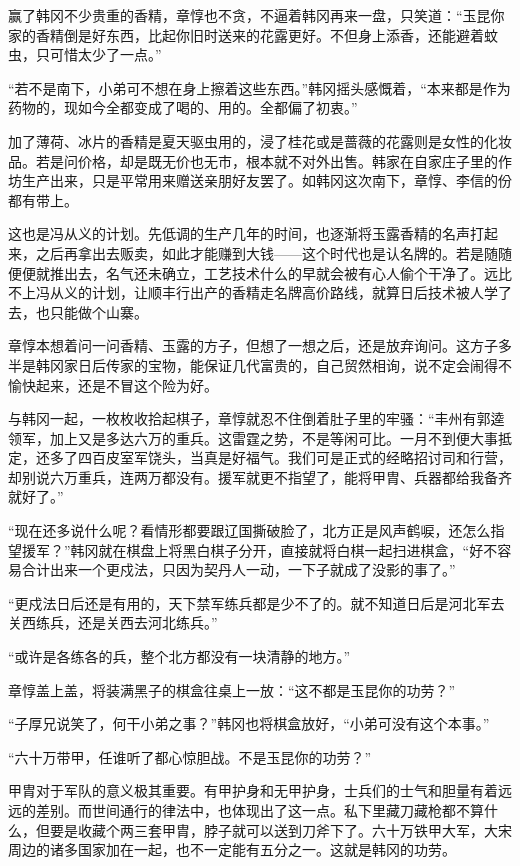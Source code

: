 赢了韩冈不少贵重的香精，章惇也不贪，不逼着韩冈再来一盘，只笑道：“玉昆你家的香精倒是好东西，比起你旧时送来的花露更好。不但身上添香，还能避着蚊虫，只可惜太少了一点。”

“若不是南下，小弟可不想在身上擦着这些东西。”韩冈摇头感慨着，“本来都是作为药物的，现如今全都变成了喝的、用的。全都偏了初衷。”

加了薄荷、冰片的香精是夏天驱虫用的，浸了桂花或是蔷薇的花露则是女性的化妆品。若是问价格，却是既无价也无市，根本就不对外出售。韩家在自家庄子里的作坊生产出来，只是平常用来赠送亲朋好友罢了。如韩冈这次南下，章惇、李信的份都有带上。

这也是冯从义的计划。先低调的生产几年的时间，也逐渐将玉露香精的名声打起来，之后再拿出去贩卖，如此才能赚到大钱——这个时代也是认名牌的。若是随随便便就推出去，名气还未确立，工艺技术什么的早就会被有心人偷个干净了。远比不上冯从义的计划，让顺丰行出产的香精走名牌高价路线，就算日后技术被人学了去，也只能做个山寨。

章惇本想着问一问香精、玉露的方子，但想了一想之后，还是放弃询问。这方子多半是韩冈家日后传家的宝物，能保证几代富贵的，自己贸然相询，说不定会闹得不愉快起来，还是不冒这个险为好。

与韩冈一起，一枚枚收拾起棋子，章惇就忍不住倒着肚子里的牢骚：“丰州有郭逵领军，加上又是多达六万的重兵。这雷霆之势，不是等闲可比。一月不到便大事抵定，还多了四百皮室军饶头，当真是好福气。我们可是正式的经略招讨司和行营，却别说六万重兵，连两万都没有。援军就更不指望了，能将甲胄、兵器都给我备齐就好了。”

“现在还多说什么呢？看情形都要跟辽国撕破脸了，北方正是风声鹤唳，还怎么指望援军？”韩冈就在棋盘上将黑白棋子分开，直接就将白棋一起扫进棋盒，“好不容易合计出来一个更戍法，只因为契丹人一动，一下子就成了没影的事了。”

“更戍法日后还是有用的，天下禁军练兵都是少不了的。就不知道日后是河北军去关西练兵，还是关西去河北练兵。”

“或许是各练各的兵，整个北方都没有一块清静的地方。”

章惇盖上盖，将装满黑子的棋盒往桌上一放：“这不都是玉昆你的功劳？”

“子厚兄说笑了，何干小弟之事？”韩冈也将棋盒放好，“小弟可没有这个本事。”

“六十万带甲，任谁听了都心惊胆战。不是玉昆你的功劳？”

甲胄对于军队的意义极其重要。有甲护身和无甲护身，士兵们的士气和胆量有着远远的差别。而世间通行的律法中，也体现出了这一点。私下里藏刀藏枪都不算什么，但要是收藏个两三套甲胄，脖子就可以送到刀斧下了。六十万铁甲大军，大宋周边的诸多国家加在一起，也不一定能有五分之一。这就是韩冈的功劳。


